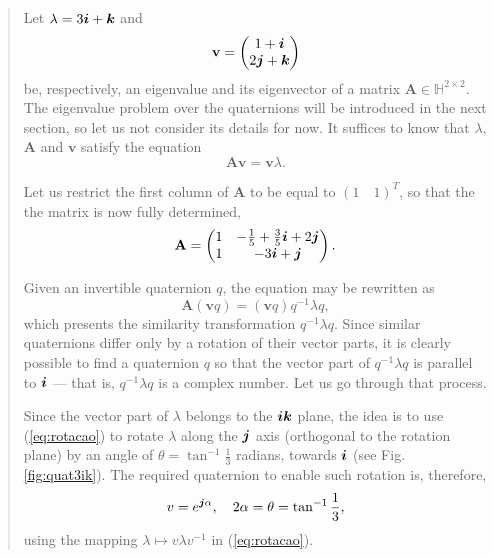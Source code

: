 \vspace{-2em}
\begin{quotation}
    \begin{example}
        \label{example:01}
        \upshape
        Let $ \lambda = 3\boldsymbol{i} + \boldsymbol{k} $ and
        \begin{equation}
            \mathbf{v} =\begin{pmatrix}
                1 +  \boldsymbol{i} \\
                2 \boldsymbol{j} + \boldsymbol{k}
            \end{pmatrix}
        \end{equation}
        be, respectively, an eigenvalue and its eigenvector of a matrix $\mathbf{A} \in \mathbb{H}^{2 \times 2}$. The eigenvalue problem over the quaternions will be introduced in the next section, so let us not consider its details for now. It suffices to know that $\lambda$, $\mathbf{A}$ and $\mathbf{v}$ satisfy the equation
        \begin{equation}
            \label{eq:03}
            \mathbf{A} \mathbf{v} = \mathbf{v} \lambda.
        \end{equation}

        Let us restrict the first column of $\mathbf{A}$ to be equal to $ (1 \quad 1)^T $, so that the the matrix is now fully determined,
        \begin{equation}
            \mathbf{A} =
            \begin{pmatrix}
                1 & - \frac{1}{5} + \frac{3}{5} \boldsymbol{i} + 2 \boldsymbol{j} \\
                1 & -3 \boldsymbol{i} + \boldsymbol{j}
            \end{pmatrix}.
        \end{equation}

        Given an invertible quaternion $q$, the equation may be rewritten as
        \begin{equation}
            \label{eq:rewritten}
            \mathbf{A} (\mathbf{v} q) = (\mathbf{v} q) q^{-1} \lambda q,
        \end{equation}
        which presents the similarity transformation $q^{-1} \lambda q$. Since similar quaternions differ only by a rotation of their vector parts, it is clearly possible to find a quaternion $q$ so that the vector part of $q^{-1} \lambda q$ is parallel to $\boldsymbol{i}$ --- that is, $q^{-1} \lambda q$ is a complex number. Let us go through that process.

        Since the vector part of $\lambda$ belongs to the $ \boldsymbol{i} \boldsymbol{k} $ plane, the idea is to use (\ref{eq:rotacao}) to rotate $\lambda$ along the $\boldsymbol{j}$ axis (orthogonal to the rotation plane) by an angle of $ \theta = \tan^{-1} \frac{1}{3} $ radians, towards $ \boldsymbol{i} $ (see Fig. \ref{fig:quat3ik}). The required quaternion to enable such rotation is, therefore,
        \begin{equation}
            \label{eq:04}
            v = e^{\boldsymbol{j} \alpha}, \quad 2\alpha = \theta = \tan^{-1} \frac{1}{3},
        \end{equation}
        using the mapping $ \lambda \mapsto v \lambda v^{-1} $ in (\ref{eq:rotacao}).


\end{example}
\end{quotation}
